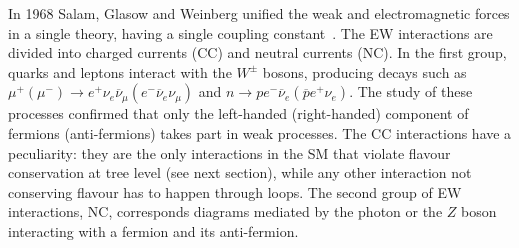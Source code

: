 In 1968 Salam, Glasow and Weinberg unified the weak and electromagnetic forces in a single theory,
having a single coupling constant~\cite{PDG2014}. The EW interactions are divided into charged currents (CC) and neutral
currents (NC). In the first group, quarks and leptons interact with the $W^\pm$ bosons, producing decays such as
$\mu^+(\mu^-) \rightarrow e^+ \nu_e \overline{\nu}_\mu (e^- \overline{\nu}_e \nu_\mu)$ and $n \rightarrow p e^- \overline{\nu}_e (\overline{p} e^+ \nu_e)$.
The study of these processes confirmed that only the left-handed (right-handed) component of fermions (anti-fermions)
takes part in weak processes. The CC interactions have a peculiarity: they are the only interactions in the SM that violate
flavour conservation at tree level (see next section), while any other interaction not conserving flavour has to happen through
loops. The second group of EW interactions, NC, corresponds diagrams mediated by the photon or the $Z$ boson interacting with
a fermion and its anti-fermion.

%
%
%
%
%
%
%
%
%






